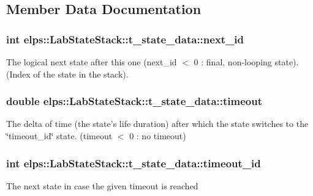 \subsection{Member Data Documentation}
\hypertarget{structelps_1_1_lab_state_stack_1_1t__state__data_ac4dcaf3ae601cca167790f614b3218d5}{
\subsubsection[{next\+\_\+id}]{\setlength{\rightskip}{0pt plus 5cm}int elps\+::\+Lab\+State\+Stack\+::t\+\_\+state\+\_\+data\+::next\+\_\+id}}\label{structelps_1_1_lab_state_stack_1_1t__state__data_ac4dcaf3ae601cca167790f614b3218d5}
The logical next state after this one (next\+\_\+id $<$ 0 \+: final, non-\/looping state). (Index of the state in the stack). \hypertarget{structelps_1_1_lab_state_stack_1_1t__state__data_a8e9d1bb6ddfa12335fd73274f0aeae08}{
\subsubsection[{timeout}]{\setlength{\rightskip}{0pt plus 5cm}double elps\+::\+Lab\+State\+Stack\+::t\+\_\+state\+\_\+data\+::timeout}}\label{structelps_1_1_lab_state_stack_1_1t__state__data_a8e9d1bb6ddfa12335fd73274f0aeae08}
The delta of time (the state's life duration) after which the state switches to the \char`\"{}timeout\+\_\+id\char`\"{} state. (timeout $<$ 0 \+: no timeout) \hypertarget{structelps_1_1_lab_state_stack_1_1t__state__data_ae35e346075e8c9a36439ee0e250495e5}{
\subsubsection[{timeout\+\_\+id}]{\setlength{\rightskip}{0pt plus 5cm}int elps\+::\+Lab\+State\+Stack\+::t\+\_\+state\+\_\+data\+::timeout\+\_\+id}}\label{structelps_1_1_lab_state_stack_1_1t__state__data_ae35e346075e8c9a36439ee0e250495e5}
The next state in case the given timeout is reached 